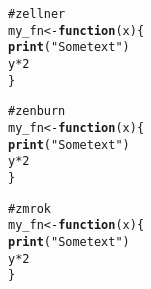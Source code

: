 \documentclass[12pt]{article}\usepackage{graphicx, color}
\makeatletter
\newcommand{\hlfunctioncall}[1]{\textcolor[rgb]{0.188235294117647,0.650980392156863,0.188235294117647}{\textbf{#1}}}%
\newcommand{\hlstring}[1]{\textcolor[rgb]{0.850980392156863,1,0.466666666666667}{#1}}%
\newcommand{\hlcomment}[1]{\textcolor[rgb]{0.533333333333333,0.533333333333333,0.533333333333333}{#1}}%
\newenvironment{kframe}{%
 \def\at@end@of@kframe{}%
 \ifinner\ifhmode%
  \def\at@end@of@kframe{\end{minipage}}%
  \begin{minipage}{\columnwidth}%
 \fi\fi%
 \def\FrameCommand##1{\hskip\@totalleftmargin \hskip-\fboxsep
 \colorbox{shadecolor}{##1}\hskip-\fboxsep
     \hskip-\linewidth \hskip-\@totalleftmargin \hskip\columnwidth}%
 \MakeFramed {\advance\hsize-\width
   \@totalleftmargin\z@ \linewidth\hsize
   \@setminipage}}%
 {\par\unskip\endMakeFramed%
 \at@end@of@kframe}
\newenvironment{knitrout}{}{} %
\makeatother
\begin{document}
\begin{knitrout}
\color{fgcolor}\begin{kframe}
\begin{alltt}
\hlcomment{# zellner}
my_fn <- \hlfunctioncall{function}(x) \{
    \hlfunctioncall{print}(\hlstring{"Some text"})
    y * 2
\}
\end{alltt}
\end{kframe}
\end{knitrout}





\begin{knitrout}
\color{fgcolor}\begin{kframe}
\begin{alltt}
\hlcomment{# zenburn}
my_fn <- \hlfunctioncall{function}(x) \{
    \hlfunctioncall{print}(\hlstring{"Some text"})
    y * 2
\}
\end{alltt}
\end{kframe}
\end{knitrout}





\begin{knitrout}
\color{fgcolor}\begin{kframe}
\begin{alltt}
\hlcomment{# zmrok}
my_fn <- \hlfunctioncall{function}(x) \{
    \hlfunctioncall{print}(\hlstring{"Some text"})
    y * 2
\}
\end{alltt}
\end{kframe}
\end{knitrout}
\end{document}
